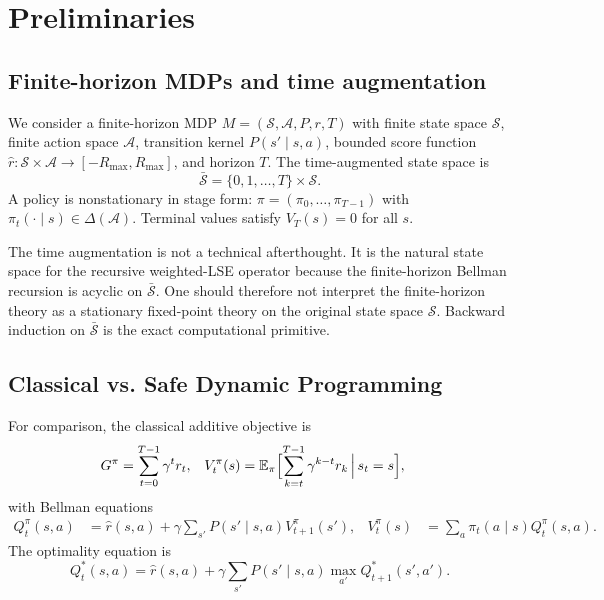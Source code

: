\documentclass{article}
\theoremstyle{remark}
\newcommand{\E}{\mathbb{E}}
\newcommand{\cS}{\mathcal{S}}
\newcommand{\cA}{\mathcal{A}}
\begin{document}
\section{Preliminaries}
\label{sec:prelim}

\subsection{Finite-horizon MDPs and time augmentation}
We consider a finite-horizon MDP $M=(\cS,\cA,P,r,T)$ with finite state space $\cS$, finite action space $\cA$, transition kernel $P(s'\mid s,a)$, bounded score function $\hat r : \cS\times\cA \to [-R_{\max},R_{\max}]$, and horizon $T$.
The time-augmented state space is
\[
\bar{\cS} = \{0,1,\dots,T\}\times \cS.
\]
A policy is nonstationary in stage form: $\pi=(\pi_0,\dots,\pi_{T-1})$ with $\pi_t(\cdot\mid s) \in \Delta(\cA)$.
Terminal values satisfy $V_T(s)=0$ for all $s$.

The time augmentation is not a technical afterthought.
It is the natural state space for the recursive weighted-LSE operator because the finite-horizon Bellman recursion is acyclic on $\bar{\cS}$.
One should therefore not interpret the finite-horizon theory as a stationary fixed-point theory on the original state space $\cS$.
Backward induction on $\bar{\cS}$ is the exact computational primitive.

\subsection{Classical vs. Safe Dynamic Programming}
For comparison, the classical additive objective is
\begin{align}
G^\pi &= \sum_{t=0}^{T-1} \gamma^t r_t,
&
V^\pi_t(s) &= \E_\pi\Bigl[\sum_{k=t}^{T-1}\gamma^{k-t}r_k\,\Big|\, s_t=s\Bigr],
\label{eq:additive-return}
\end{align}
with Bellman equations
\begin{align}
Q^\pi_t(s,a) &= \hat r(s,a) + \gamma \sum_{s'}P(s'\mid s,a)V^\pi_{t+1}(s'),
&
V^\pi_t(s) &= \sum_a \pi_t(a\mid s)Q^\pi_t(s,a).
\label{eq:additive-bellman}
\end{align}
The optimality equation is
\[
Q^*_t(s,a)=\hat r(s,a)+\gamma\sum_{s'}P(s'\mid s,a)\max_{a'}Q^*_{t+1}(s',a').
\]
\end{document}
